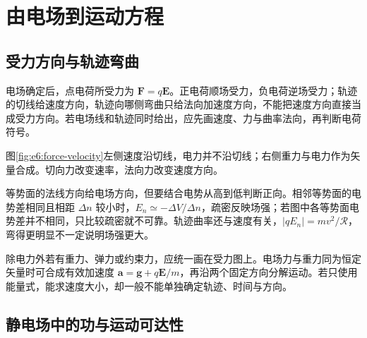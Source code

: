 \section{由电场到运动方程}
\subsection{受力方向与轨迹弯曲}

电场确定后，点电荷所受力为 $\bm F=q\bm E$。正电荷顺场受力，负电荷逆场受力；轨迹的切线给速度方向，轨迹向哪侧弯曲只给法向加速度方向，不能把速度方向直接当成受力方向。若电场线和轨迹同时给出，应先画速度、力与曲率法向，再判断电荷符号。

\par 图\ref{fig:e6:force-velocity}左侧速度沿切线，电力并不沿切线；右侧重力与电力作为矢量合成。切向力改变速率，法向力改变速度方向。

等势面的法线方向给电场方向，但要结合电势从高到低判断正向。相邻等势面的电势差相同且相距 $\Delta n$ 较小时，$E_n\simeq-\Delta V/\Delta n$，疏密反映场强；若图中各等势面电势差并不相同，只比较疏密就不可靠。轨迹曲率还与速度有关，$|qE_n|=mv^2/\mathcal R$，弯得更明显不一定说明场强更大。

除电力外若有重力、弹力或约束力，应统一画在受力图上。电场力与重力同为恒定矢量时可合成有效加速度 $\bm a=\bm g+q\bm E/m$，再沿两个固定方向分解运动。若只使用能量式，能求速度大小，却一般不能单独确定轨迹、时间与方向。

\subsection{静电场中的功与运动可达性}

